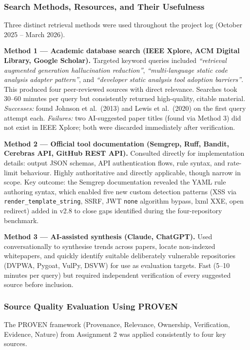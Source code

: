 \documentclass[12pt,a4paper]{article}
\begin{document}
\subsubsection{Search Methods, Resources, and Their Usefulness}

Three distinct retrieval methods were used throughout the project log (October
2025 -- March 2026).

\textbf{Method 1 --- Academic database search (IEEE Xplore, ACM Digital Library,
Google Scholar).}  Targeted keyword queries included \emph{``retrieval augmented
generation hallucination reduction''}, \emph{``multi-language static code analysis
adapter pattern''}, and \emph{``developer static analysis tool adoption barriers''}.
This produced four peer-reviewed sources with direct relevance.  Searches took
30--60 minutes per query but consistently returned high-quality, citable material.
\emph{Successes:} found Johnson et al.\ (2013) and Lewis et al.\ (2020) on the first
query attempt each.  \emph{Failures:} two AI-suggested paper titles (found via Method
3) did not exist in IEEE Xplore; both were discarded immediately after verification.

\textbf{Method 2 --- Official tool documentation (Semgrep, Ruff, Bandit, Cerebras
API, GitHub REST API).}  Consulted directly for implementation details: output JSON
schemas, API authentication flows, rule syntax, and rate-limit behaviour.  Highly
authoritative and directly applicable, though narrow in scope.  Key outcome: the
Semgrep documentation revealed the YAML rule authoring syntax, which enabled five
new custom detection patterns (XSS via \texttt{render\_template\_string}, SSRF, JWT
\texttt{none} algorithm bypass, lxml XXE, open redirect) added in v2.8 to close gaps
identified during the four-repository benchmark.

\textbf{Method 3 --- AI-assisted synthesis (Claude, ChatGPT).}  Used conversationally
to synthesise trends across papers, locate non-indexed whitepapers, and quickly
identify suitable deliberately vulnerable repositories (DVPWA, Pygoat, VulPy, DSVW)
for use as evaluation targets.  Fast (5--10 minutes per query) but required
independent verification of every suggested source before inclusion.

\subsubsection{Source Quality Evaluation Using PROVEN}

The PROVEN framework (Provenance, Relevance, Ownership, Verification, Evidence,
Nature) from Assignment 2 was applied consistently to four key sources.
\end{document}
